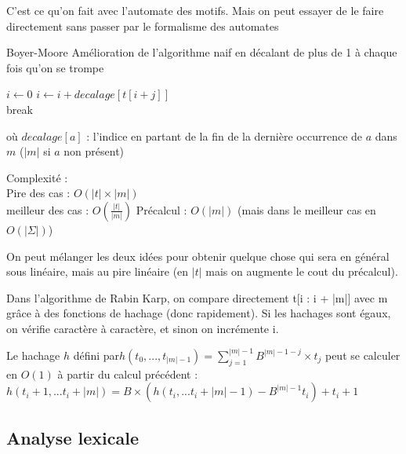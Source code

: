 \begin{com}
	C'est ce qu'on fait avec l'automate des motifs. Mais on peut essayer de le faire directement sans passer par le formalisme des automates
\end{com}

\begin{algo}{Boyer-Moore}
	Amélioration de l'algorithme naif en décalant de plus de 1 à chaque fois qu'on se trompe
	
	\begin{algorithm}[H]
		$i \gets 0$
		{
			{
				{
					$i \gets i + decalage[t[i+j]]$\\
					break
				}
			}
		}
	\end{algorithm}
	où $decalage[a]$ : l'indice en partant de la fin de la dernière occurrence de $a$ dans $m$ ($|m|$ si $a$ non présent)
\end{algo}

\begin{proposition}Complexité :\\
	Pire des cas : $O(|t|\times|m|)$\\
	meilleur des cas : $O\left(\frac{|t|}{|m|}\right)$
	Précalcul : $O(|m|)$ (mais dans le meilleur cas en $O(|\Sigma|)$)
\end{proposition}

\begin{rem}
	On peut mélanger les deux idées pour obtenir quelque chose qui sera en général sous linéaire, mais au pire linéaire (en $|t|$ mais on augmente le cout du précalcul).
\end{rem}

\begin{idee}
	Dans l'algorithme de Rabin Karp, on compare directement t[i : i + |m|]  avec m grâce à des fonctions de hachage (donc rapidement). Si  les hachages sont égaux, on vérifie caractère à caractère, et sinon on incrémente i.
\end{idee}

\begin{rem}
	Le hachage $h$ défini par$ h(t_0, ..., t_{|m|-1}) = \sum\limits_{j = 1}^{|m|-1} B^{|m|-1-j}\times t_j$ peut se calculer en $O(1)$ à partir du calcul précédent : $h(t_i+1,...t_i+|m|) = B \times (h(t_i,...t_i+|m|-1) - B^{|m|-1}t_i) + t_i+1$
\end{rem}

\subsection{Analyse lexicale}

